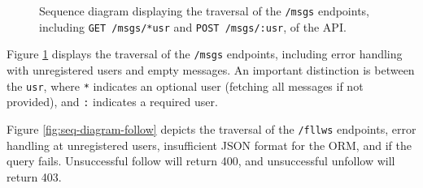 \documentclass[12pt, a4paper, oneside]{book}
\begin{document}
\begin{figure}[H]
    \centering
    \caption{Sequence diagram displaying the traversal of the \texttt{/msgs} endpoints, including \texttt{GET /msgs/*usr} and \texttt{POST /msgs/:usr}, of the API.}
    \label{fig:seq-diagram-message}
\end{figure}

\newpage

Figure \ref{fig:seq-diagram-message} displays the traversal of the \texttt{/msgs} endpoints, including error handling with unregistered users and empty messages.
An important distinction is between the \texttt{usr}, where \texttt{*} indicates an optional user (fetching all messages if not provided), and \texttt{:} indicates a required user.

Figure \ref{fig:seq-diagram-follow} depicts the traversal of the \texttt{/fllws} endpoints, error handling at unregistered users, insufficient JSON format for the ORM, and if the query fails.
Unsuccessful follow will return 400, and unsuccessful unfollow will return 403.
\end{document}
